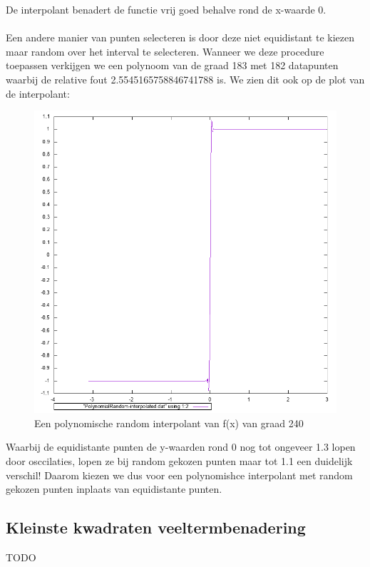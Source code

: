\documentclass[10pt,a4paper]{article}
\begin{document}
De interpolant benadert de functie vrij goed behalve rond de x-waarde 0.
\\
\\
Een andere manier van punten selecteren is door deze niet equidistant te kiezen maar random over het interval te selecteren. Wanneer we deze procedure toepassen verkijgen we een polynoom van de graad 183 met 182 datapunten waarbij de relative fout 2.5545165758846741788 is. We zien dit ook op de plot van de interpolant:
\begin{figure}[H]
\centering
\includegraphics[scale=0.3]{../Twographs/PolynomialRandom-interpolated}
\caption{Een polynomische random interpolant van f(x) van graad 240}
\end{figure}
\begin{figure}[H]
\end{figure}
Waarbij de equidistante punten de y-waarden rond 0 nog tot ongeveer 1.3 lopen door osccilaties, lopen ze bij random gekozen punten maar tot 1.1 een duidelijk verschil! Daarom kiezen we dus voor een polynomishce interpolant met random gekozen punten inplaats van equidistante punten.
\subsection{Kleinste kwadraten veeltermbenadering}
TODO
\end{document}

